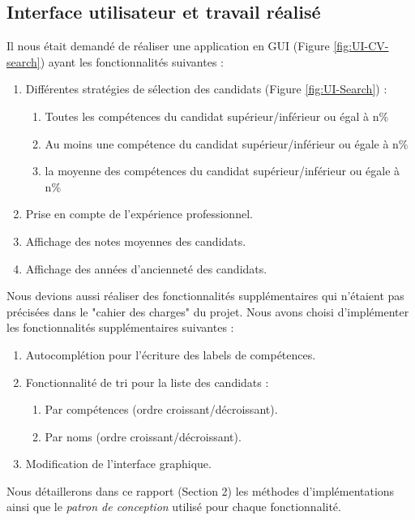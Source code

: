 \documentclass{article}
\begin{document}
\subsection{Interface utilisateur et travail réalisé}
Il nous était demandé de réaliser une application en GUI (Figure \ref{fig:UI-CV-search}) ayant les fonctionnalités suivantes :
\begin{enumerate}
\item Différentes stratégies de sélection des candidats (Figure \ref{fig:UI-Search}) :
    \begin{enumerate}
        \item Toutes les compétences du candidat supérieur/inférieur ou égal à n\%
        \item Au moins une compétence du candidat supérieur/inférieur ou égale à n\%
        \item la moyenne des compétences du candidat supérieur/inférieur ou égale à n\%
    \end{enumerate}
\item Prise en compte de l'expérience professionnel.
\item Affichage des notes moyennes des candidats.
\item Affichage des années d'ancienneté des candidats.
\end{enumerate}
Nous devions aussi réaliser des fonctionnalités supplémentaires qui n'étaient pas précisées dans le "cahier des charges" du projet. Nous avons choisi d'implémenter les fonctionnalités supplémentaires suivantes : 
\begin{enumerate}
\item Autocomplétion pour l'écriture des labels de compétences. 
\item Fonctionnalité de tri pour la liste des candidats :
    \begin{enumerate}
            \item Par compétences (ordre croissant/décroissant).
            \item Par noms (ordre croissant/décroissant).
        \end{enumerate}
\item Modification de l'interface graphique.
\end{enumerate}
Nous détaillerons dans ce rapport (Section 2) les méthodes d'implémentations ainsi que le \textit{patron de conception} utilisé pour chaque fonctionnalité.
\end{document}
